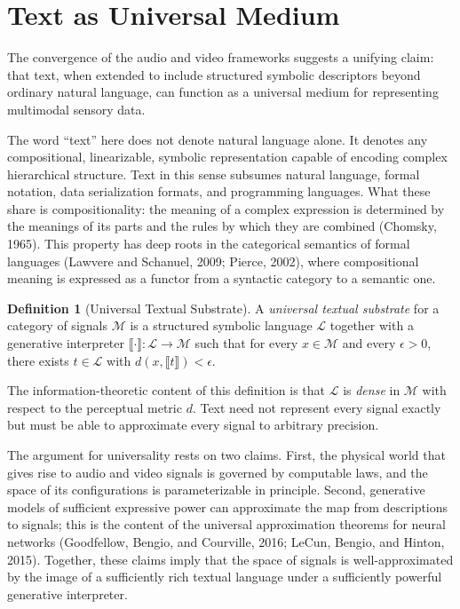\documentclass[11pt,a4paper]{article}
\theoremstyle{definition}
\newtheorem{definition}[theorem]{Definition}
\theoremstyle{remark}
\begin{document}
\section{Text as Universal Medium}
\label{sec:text_medium}

The convergence of the audio and video frameworks suggests a unifying claim: that text, when extended to include structured symbolic descriptors beyond ordinary natural language, can function as a universal medium for representing multimodal sensory data.

The word ``text'' here does not denote natural language alone. It denotes any compositional, linearizable, symbolic representation capable of encoding complex hierarchical structure. Text in this sense subsumes natural language, formal notation, data serialization formats, and programming languages. What these share is compositionality: the meaning of a complex expression is determined by the meanings of its parts and the rules by which they are combined (Chomsky, 1965). This property has deep roots in the categorical semantics of formal languages (Lawvere and Schanuel, 2009; Pierce, 2002), where compositional meaning is expressed as a functor from a syntactic category to a semantic one.

\begin{definition}[Universal Textual Substrate]
A \emph{universal textual substrate} for a category of signals $\mathcal{M}$ is a structured symbolic language $\mathcal{L}$ together with a generative interpreter $\llbracket \cdot \rrbracket : \mathcal{L} \rightarrow \mathcal{M}$ such that for every $x \in \mathcal{M}$ and every $\epsilon > 0$, there exists $t \in \mathcal{L}$ with $d(x, \llbracket t \rrbracket) < \epsilon$.
\end{definition}

The information-theoretic content of this definition is that $\mathcal{L}$ is \emph{dense} in $\mathcal{M}$ with respect to the perceptual metric $d$. Text need not represent every signal exactly but must be able to approximate every signal to arbitrary precision.

The argument for universality rests on two claims. First, the physical world that gives rise to audio and video signals is governed by computable laws, and the space of its configurations is parameterizable in principle. Second, generative models of sufficient expressive power can approximate the map from descriptions to signals; this is the content of the universal approximation theorems for neural networks (Goodfellow, Bengio, and Courville, 2016; LeCun, Bengio, and Hinton, 2015). Together, these claims imply that the space of signals is well-approximated by the image of a sufficiently rich textual language under a sufficiently powerful generative interpreter.
\end{document}
